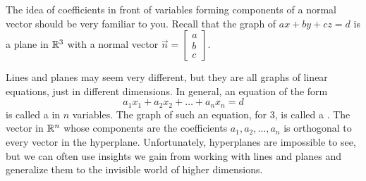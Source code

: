 \documentclass{ximera}
\begin{document}
 
 
\begin{onlineOnly}
\begin{center}
\end{center}
\end{onlineOnly}
 
The idea of coefficients in front of variables forming components of a normal vector should be very familiar to you.  Recall that the graph of $ax+by+cz=d$ is a plane in $\mathbb{R}^3$ with a normal vector $\vec{n}=\begin{bmatrix}a\\b\\c\end{bmatrix}$.


 
Lines and planes may seem very different, but they are all graphs of linear equations, just in different dimensions.  In general, an equation of the form
$$a_1x_1+a_2x_2+\dots +a_nx_n=d$$
is called a  in $n$ variables.  The graph of such an equation, for $3$, is called a .  The vector in $\mathbb{R}^n$ whose components are the coefficients $a_1, a_2, \dots ,a_n$ is orthogonal to every vector in the hyperplane.  Unfortunately, hyperplanes are impossible to see, but we can often use insights we gain from working with lines and planes and generalize them to the invisible world of higher dimensions.
 
\end{document}
